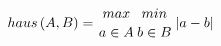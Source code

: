 \begin{equation}
 \begin{aligned}
 haus\left( A,B \right) = {max \atop {a \in A }} {min \atop {b \in B}} \left| a-b \right|\label{eqn:haus} 
\end{aligned}
\end{equation}
